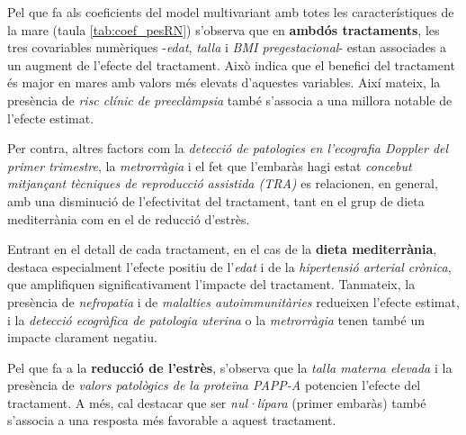 \documentclass[../main.tex]{subfiles}
\begin{document}
    Pel que fa als coeficients del model multivariant amb totes les característiques de la mare (taula \ref{tab:coef_pesRN}) s'observa que en \textbf{ambdós tractaments}, les tres covariables numèriques -\textit{edat}, \textit{talla} i \textit{BMI pregestacional}- estan associades a un augment de l’efecte del tractament. Això indica que el benefici del tractament és major en mares amb valors més elevats d’aquestes variables. Així mateix, la presència de \textit{risc clínic de preeclàmpsia} també s’associa a una millora notable de l’efecte estimat.\par
    Per contra, altres factors com la \textit{detecció de patologies en l’ecografia Doppler del primer trimestre}, la \textit{metrorràgia} i el fet que l’embaràs hagi estat \textit{concebut mitjançant tècniques de reproducció assistida (TRA)} es relacionen, en general, amb una disminució de l’efectivitat del tractament, tant en el grup de dieta mediterrània com en el de reducció d'estrès.\par
    Entrant en el detall de cada tractament, en el cas de la \textbf{dieta mediterrània}, destaca especialment l’efecte positiu de l’\textit{edat} i de la \textit{hipertensió arterial crònica}, que amplifiquen significativament l’impacte del tractament. Tanmateix, la presència de \textit{nefropatia} i de \textit{malalties autoimmunitàries} redueixen l’efecte estimat, i la \textit{detecció ecogràfica de patologia uterina} o la \textit{metrorràgia} tenen també un impacte clarament negatiu.\par
    Pel que fa a la \textbf{reducció de l'estrès}, s’observa que la \textit{talla materna elevada} i la presència de \textit{valors patològics de la proteïna PAPP-A} potencien l’efecte del tractament. A més, cal destacar que ser \textit{nul·lípara} (primer embaràs) també s’associa a una resposta més favorable a aquest tractament.\par

    
\end{document}
